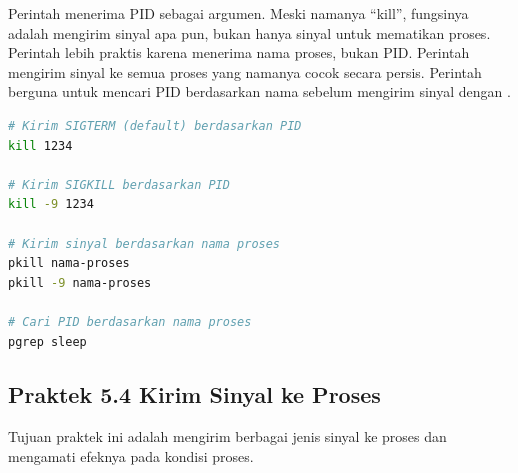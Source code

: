 Perintah  menerima PID sebagai argumen. Meski namanya ``kill'', fungsinya adalah
mengirim sinyal apa pun, bukan hanya sinyal untuk mematikan proses. Perintah 
lebih praktis karena menerima nama proses, bukan PID. Perintah  mengirim
sinyal ke semua proses yang namanya cocok secara persis. Perintah  berguna
untuk mencari PID berdasarkan nama sebelum mengirim sinyal dengan .

\begin{lstlisting}[language=bash, caption={Cara-cara mengirim sinyal}]
# Kirim SIGTERM (default) berdasarkan PID
kill 1234

# Kirim SIGKILL berdasarkan PID
kill -9 1234

# Kirim sinyal berdasarkan nama proses
pkill nama-proses
pkill -9 nama-proses

# Cari PID berdasarkan nama proses
pgrep sleep
\end{lstlisting}

\subsection*{Praktek 5.4 Kirim Sinyal ke Proses}

Tujuan praktek ini adalah mengirim berbagai jenis sinyal ke proses dan mengamati
efeknya pada kondisi proses.


